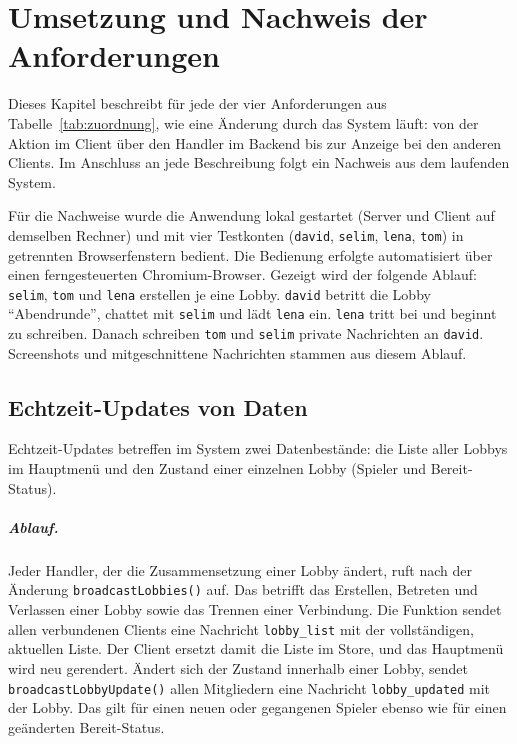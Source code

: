 \chapter{Umsetzung und Nachweis der Anforderungen}
\label{kap:umsetzung}
\verfasser{\autorDG}

Dieses Kapitel beschreibt für jede der vier Anforderungen aus Tabelle~\ref{tab:zuordnung}, wie eine Änderung durch das System läuft: von der Aktion im Client über den Handler im Backend bis zur Anzeige bei den anderen Clients. Im Anschluss an jede Beschreibung folgt ein Nachweis aus dem laufenden System.

Für die Nachweise wurde die Anwendung lokal gestartet (Server und Client auf demselben Rechner) und mit vier Testkonten (\texttt{david}, \texttt{selim}, \texttt{lena}, \texttt{tom}) in getrennten Browserfenstern bedient. Die Bedienung erfolgte automatisiert über einen ferngesteuerten Chromium-Browser. Gezeigt wird der folgende Ablauf: \texttt{selim}, \texttt{tom} und \texttt{lena} erstellen je eine Lobby. \texttt{david} betritt die Lobby \enquote{Abendrunde}, chattet mit \texttt{selim} und lädt \texttt{lena} ein. \texttt{lena} tritt bei und beginnt zu schreiben. Danach schreiben \texttt{tom} und \texttt{selim} private Nachrichten an \texttt{david}. Screenshots und mitgeschnittene Nachrichten stammen aus diesem Ablauf.

\section{Echtzeit-Updates von Daten}
\label{sec:req-echtzeit}

Echtzeit-Updates betreffen im System zwei Datenbestände: die Liste aller Lobbys im Hauptmenü und den Zustand einer einzelnen Lobby (Spieler und Bereit-Status).

\paragraph{Ablauf.} Jeder Handler, der die Zusammensetzung einer Lobby ändert, ruft nach der Änderung \texttt{broadcastLobbies()} auf. Das betrifft das Erstellen, Betreten und Verlassen einer Lobby sowie das Trennen einer Verbindung. Die Funktion sendet allen verbundenen Clients eine Nachricht \texttt{lobby\_list} mit der vollständigen, aktuellen Liste. Der Client ersetzt damit die Liste im Store, und das Hauptmenü wird neu gerendert. Ändert sich der Zustand innerhalb einer Lobby, sendet \texttt{broadcastLobbyUpdate()} allen Mitgliedern eine Nachricht \texttt{lobby\_updated} mit der Lobby. Das gilt für einen neuen oder gegangenen Spieler ebenso wie für einen geänderten Bereit-Status.

